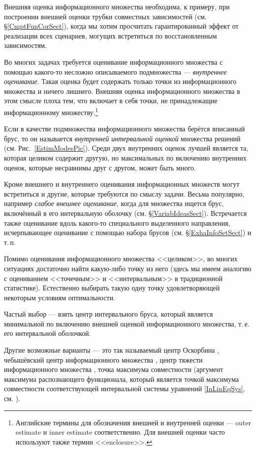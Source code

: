 \documentclass[a5paper,openany]{book}
\begin{document}
Внешняя оценка информационного множества необходима, к примеру, при построении внешней 
оценки трубки совместных зависимостей (см. \S\ref{CmptFunCorSect}), когда мы хотим 
просчитать гарантированный эффект от реализации всех сценариев, могущих встретиться 
по восстановленным зависимостям. 
  
Во многих задачах требуется оценивание информационного множества с помощью какого-то 
несложно описываемого подмножества --- \emph{внутреннее оценивание}. Такая оценка будет 
содержать только точки из информационного множества и ничего 
лишнего. Внешняя оценка информационного множества в этом смысле плоха тем, что включает 
в себя точки, не принадлежащие информационному множеству.\footnote{Английские термины 
для обозначения внешней и внутренней оценки --- outer estimate и inner estimate 
соответственно. Для внешней оценки часто используют также термин <<enclosure>>.} 
  
Если в качестве подмножества информационного множества берётся вписанный брус, 
то он называется \emph{внутренней интервальной оценкой} множества решений (см. 
Рис.~\ref{EstimModesPic}). Среди двух внутренних оценок лучшей является та, которая 
целиком содержит другую, но максимальных по включению внутренних оценок, которые 
несравнимы друг с другом, может быть много. 
  
Кроме внешнего и внутреннего оценивания информационных множеств могут встретиться 
и другие, которые требуются по смыслу задачи. Весьма популярно, например \emph{слабое 
внешнее оценивание}, когда для множества ищется брус, 
включённый в его интервальную оболочку (см. \S\ref{VariabIdeasSect}). Встречается 
также оценивание вдоль какого-то специального выделенного направления, исчерпывающее 
оценивание с помощью набора брусов (см. \S\ref{ExhaInfoSetSect}) и т.\,п. 
  
Помимо оценивания информационного множества <<целиком>>, во многих ситуациях 
достаточно найти какую-либо точку из него (здесь мы имеем аналогию с оцениванием 
<<точечным>> и <<интервальным>> в традиционной статистике).  Естественно выбирать 
такую одну точку удовлетворяющей некоторым условиям оптимальности. 
 
Частый выбор --- взять центр интервального бруса, который является минимальной 
по включению внешней оценкой информационного множества, т.\,е. его интервальной 
оболочкой. 
   
Другие возможные варианты --- это 
    так называемый центр Оскорбина \cite{OskorbinMaksiZhilin}, 
    чебышёвский центр информационного множества 
    \cite{VoschininSotirov,ZukhovitskiyAvdeeva},
    центр тяжести информационного множества \cite{VoschininSotirov},  
    точка максимума совместности (аргумент максимума распознающего функционала, 
    который является точкой максимума совместности соответствующей интервальной 
    системы уравнений \eqref{InLinEqSys}, см. \cite{SShary2012, SharysJCT2013, 
    SSharyIzvAN2017, SSharyPLab2020, SSharyADSAA}). 
   
\end{document}
